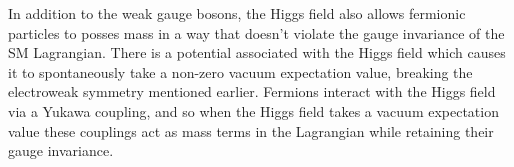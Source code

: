 
 In addition to the weak gauge bosons, the Higgs field also allows fermionic particles to posses mass in a way that doesn't violate the gauge invariance of the SM Lagrangian. There is a potential associated with the Higgs field which causes it to spontaneously take a non-zero vacuum expectation value, breaking the electroweak symmetry mentioned earlier. Fermions interact with the Higgs field via a Yukawa coupling, and so when the Higgs field takes a vacuum expectation value these couplings act as mass terms in the Lagrangian while retaining their gauge invariance. 



%
%
%
%
%
%
%
%
%
%
%
%
%
%
%
%



